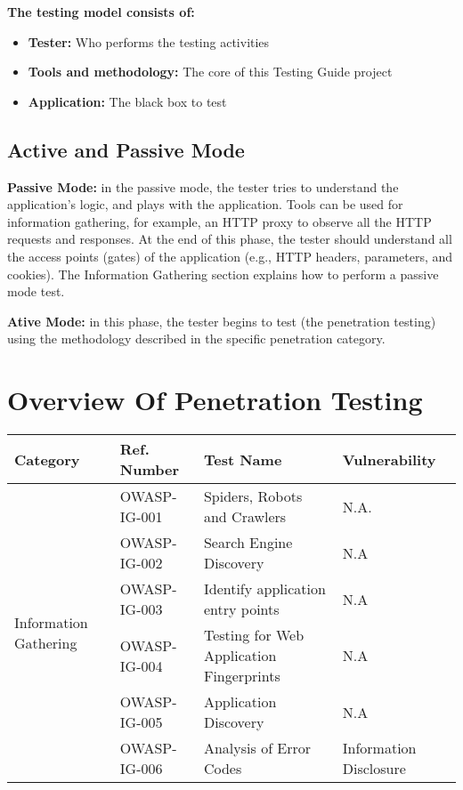 		{\bf The testing model consists of:}
			\begin{itemize}
				\item {\bf Tester:} Who performs the testing activities
				\item {\bf Tools and methodology:} The core of this Testing Guide project
				\item {\bf Application:} The black box to test
			\end{itemize}

	\subsection*{Active and Passive Mode}

		{\bf Passive Mode:} in the passive mode, the tester tries to understand the application's logic, 
		and plays with the application. Tools can be used for information gathering, for example, an 
		HTTP proxy to observe all the HTTP requests and responses. At the end of this phase, the tester 
		should understand all the access points (gates) of the application (e.g., HTTP headers, parameters,
		and cookies). The Information Gathering section explains how to perform a passive mode test.

		{\bf Ative Mode:}  in this phase, the tester begins to test (the penetration testing) using 
		the methodology described in the specific penetration category.

	\section{Overview Of Penetration Testing}

		\begin{tabularx}{15cm}{| X | X | X | X |}	
			\hline
			\rowcolor[gray]{.9}
			{\bf Category} &  {\bf Ref. Number} & {\bf Test Name} & {\bf Vulnerability} \\ \hline
			\multirow{6}{*}{\begin{minipage}{0.7in} Information Gathering \end{minipage}} & 
			OWASP-IG-001 & Spiders, Robots and Crawlers & 
			N.A. \\ \cline{2-4}
			 & OWASP-IG-002 & Search Engine Discovery & N.A \\ \cline{2-4}
			 & OWASP-IG-003 & Identify application entry points & N.A \\ \cline{2-4}
		 	 & OWASP-IG-004 & Testing for Web Application Fingerprints & N.A \\ \cline{2-4}
			 & OWASP-IG-005 & Application Discovery & N.A \\ \cline{2-4}
			 & OWASP-IG-006 & Analysis of Error Codes & Information Disclosure \\ \hline
		\end{tabularx}

